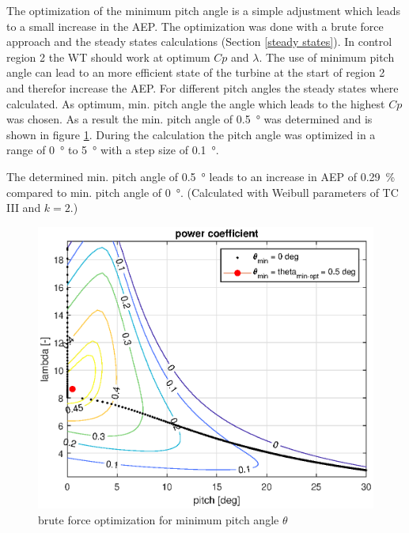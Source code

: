 The optimization of the minimum pitch angle is a simple adjustment which leads to a small increase in the AEP. 
The optimization was done with a brute force approach and the steady states calculations (Section \ref{steady states}). 
In control region 2 the WT should work at optimum $Cp$ and $\lambda$. 
The use of minimum pitch angle can lead to an more efficient state of the turbine at the start of region 2 and therefor increase the AEP. 
For different pitch angles the steady states where calculated. 
As optimum, min. pitch angle the angle which leads to the highest $Cp$ was chosen. 
As a result the min. pitch angle of \SI{0.5}{\degree} was determined and is shown in figure \ref{fig:theta min general}. 
During the calculation the pitch angle was optimized in a range of \SI{0}{\degree} to \SI{5}{\degree} with a step size of \SI{0.1}{\degree}.

The determined min. pitch angle of \SI{0.5}{\degree} leads to an increase in AEP of \SI{0.29}{\%} compared to min. pitch angle of \SI{0}{\degree}. 
(Calculated with Weibull parameters of TC III and $k=2$.)

\begin{figure}[tbh]
	\centering	
	\includegraphics[width=12cm]{Figures/ThetaMinOpt}
	\caption{brute force optimization for minimum pitch angle $\theta$}
	\label{fig:theta min general}
\end{figure}
